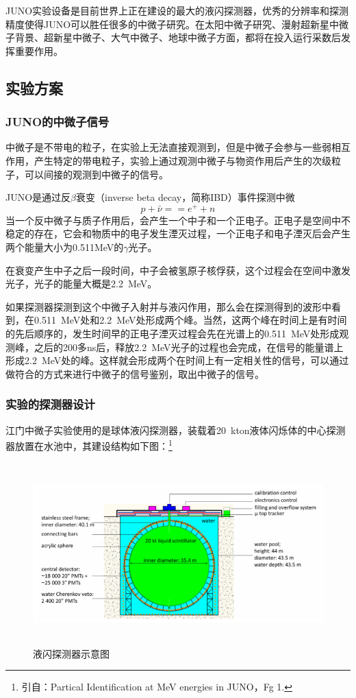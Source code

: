 \documentclass[10pt,a4paper]{article}
\begin{document}
JUNO实验设备是目前世界上正在建设的最大的液闪探测器，优秀的分辨率和探测精度使得JUNO可以胜任很多的中微子研究。在太阳中微子研究、漫射超新星中微子背景、超新星中微子、大气中微子、地球中微子方面，都将在投入运行采数后发挥重要作用。

\subsection{实验方案}\label{sub:logicinter}

\subsubsection{JUNO的中微子信号}\label{sub:logicinter}

中微子是不带电的粒子，在实验上无法直接观测到，但是中微子会参与一些弱相互作用，产生特定的带电粒子，实验上通过观测中微子与物资作用后产生的次级粒子，可以间接的观测到中微子的信号。

JUNO是通过反$\beta$衰变（inverse beta decay，简称IBD）事件探测中微$$p+\bar{\nu}==e^{+}+n$$
当一个反中微子与质子作用后，会产生一个中子和一个正电子。正电子是空间中不稳定的存在，它会和物质中的电子发生湮灭过程，一个正电子和电子湮灭后会产生两个能量大小为0.511MeV的$\gamma$光子。

在衰变产生中子之后一段时间，中子会被氢原子核俘获，这个过程会在空间中激发光子，光子的能量大概是\SI{2.2}{MeV}。

如果探测器探测到这个中微子入射并与液闪作用，那么会在探测得到的波形中看到，在\SI{0.511}{MeV}处和\SI{2.2}{MeV}处形成两个峰。当然，这两个峰在时间上是有时间的先后顺序的，发生时间早的正电子湮灭过程会先在光谱上的\SI{0.511}{MeV}处形成观测峰，之后的200多ns后，释放\SI{2.2}{MeV}光子的过程也会完成，在信号的能量谱上形成\SI{2.2}{MeV}处的峰。这样就会形成两个在时间上有一定相关性的信号，可以通过做符合的方式来进行中微子的信号鉴别，取出中微子的信号。

\subsubsection{实验的探测器设计}\label{sub:logicinter}

江门中微子实验使用的是球体液闪探测器，装载着\SI{20}{kton}液体闪烁体的中心探测器放置在水池中，其建设结构如下图：\footnote{引自：Partical Identification at MeV energies in JUNO，Fg 1.}

\begin{figure}[ht]
 \centering
 \includegraphics[height=7cm]{images/探测器示意图.png}
 \caption{液闪探测器示意图}
 \label{fig:singleblock}
\end{figure}
\end{document}
